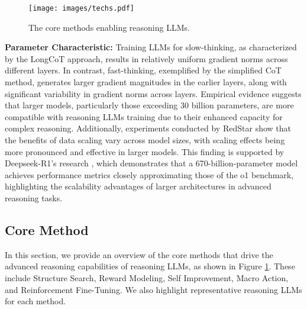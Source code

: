 \begin{figure}[t]
    \centering
    \texttt{[image: images/techs.pdf]}
    \caption{The core methods enabling reasoning LLMs.}
    \label{fig:techs}
\end{figure}



\noindent\textbf{Parameter Characteristic:} 
Training LLMs for slow-thinking, as characterized by the LongCoT approach, results in relatively uniform gradient norms across different layers. 
In contrast, fast-thinking, exemplified by the simplified CoT method, generates larger gradient magnitudes in the earlier layers, along with significant variability in gradient norms across layers. 
Empirical evidence suggests that larger models, particularly those exceeding 30 billion parameters, are more compatible with reasoning LLMs training due to their enhanced capacity for complex reasoning. 
Additionally, experiments conducted by RedStar \cite{RedStar} show that the benefits of data scaling vary across model sizes, with scaling effects being more pronounced and effective in larger models. 
This finding is supported by Deepseek-R1's research \cite{Deepseek-R1}, which demonstrates that a 670-billion-parameter model achieves performance metrics closely approximating those of the o1 benchmark, highlighting the scalability advantages of larger architectures in advanced reasoning tasks.








\subsection{Core Method}\label{foundations}

In this section, we provide an overview of the core methods that drive the advanced reasoning capabilities of reasoning LLMs, as shown in Figure \ref{fig:techs}. These include Structure Search, Reward Modeling, Self Improvement, Macro Action, and Reinforcement Fine-Tuning. 
We also highlight representative reasoning LLMs for each method.







